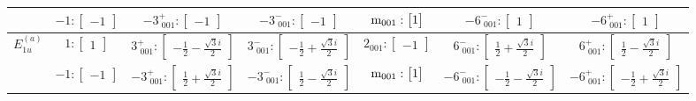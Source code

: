 \documentclass[fleqn,8pt,landscape]{jsarticle}
\begin{document}
\begin{longtable}{ccccccc}
& $ -1:\begin{bmatrix} -1 \end{bmatrix} $ & $ -3^{+}_{\,\,001}:\begin{bmatrix} -1 \end{bmatrix} $ & $ -3^{-}_{\,\,001}:\begin{bmatrix} -1 \end{bmatrix} $ & $ {\rm m}_{001}:\begin{bmatrix} 1 \end{bmatrix} $ & $ -6^{-}_{\,\,001}:\begin{bmatrix} 1 \end{bmatrix} $ & $ -6^{+}_{\,\,001}:\begin{bmatrix} 1 \end{bmatrix} $ \\ \hline
$ E_{1u}^{(a)} $ & $ 1:\begin{bmatrix} 1 \end{bmatrix} $ & $ 3^{+}_{\,\,001}:\begin{bmatrix} - \frac{1}{2} - \frac{\sqrt{3} i}{2} \end{bmatrix} $ & $ 3^{-}_{\,\,001}:\begin{bmatrix} - \frac{1}{2} + \frac{\sqrt{3} i}{2} \end{bmatrix} $ & $ 2{}_{001}:\begin{bmatrix} -1 \end{bmatrix} $ & $ 6^{-}_{\,\,001}:\begin{bmatrix} \frac{1}{2} + \frac{\sqrt{3} i}{2} \end{bmatrix} $ & $ 6^{+}_{\,\,001}:\begin{bmatrix} \frac{1}{2} - \frac{\sqrt{3} i}{2} \end{bmatrix} $ \\
& $ -1:\begin{bmatrix} -1 \end{bmatrix} $ & $ -3^{+}_{\,\,001}:\begin{bmatrix} \frac{1}{2} + \frac{\sqrt{3} i}{2} \end{bmatrix} $ & $ -3^{-}_{\,\,001}:\begin{bmatrix} \frac{1}{2} - \frac{\sqrt{3} i}{2} \end{bmatrix} $ & $ {\rm m}_{001}:\begin{bmatrix} 1 \end{bmatrix} $ & $ -6^{-}_{\,\,001}:\begin{bmatrix} - \frac{1}{2} - \frac{\sqrt{3} i}{2} \end{bmatrix} $ & $ -6^{+}_{\,\,001}:\begin{bmatrix} - \frac{1}{2} + \frac{\sqrt{3} i}{2} \end{bmatrix} $ \\ \hline

\end{longtable}
\end{document}
